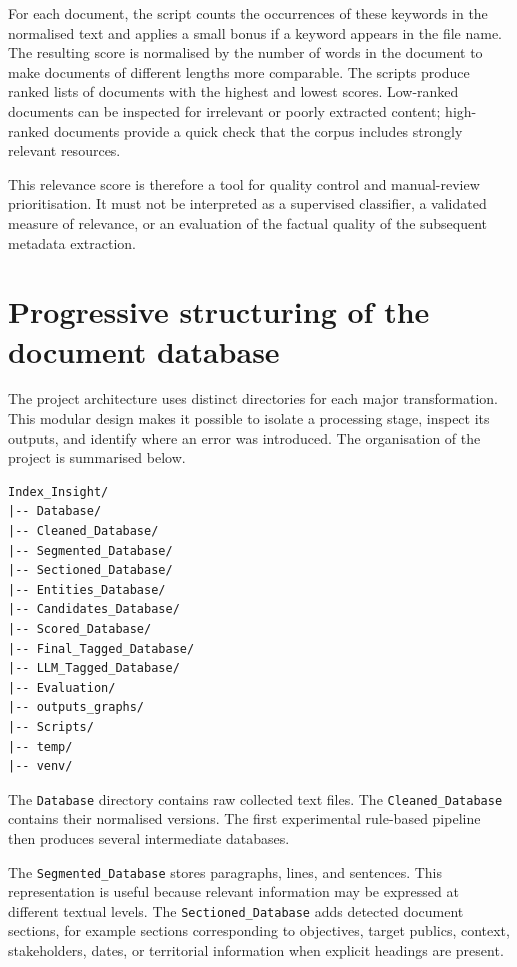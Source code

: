 For each document, the script counts the occurrences of these keywords in the
normalised text and applies a small bonus if a keyword appears in the file name.
The resulting score is normalised by the number of words in the document to make
documents of different lengths more comparable. The scripts produce ranked lists
of documents with the highest and lowest scores. Low-ranked documents can be
inspected for irrelevant or poorly extracted content; high-ranked documents
provide a quick check that the corpus includes strongly relevant resources.

This relevance score is therefore a tool for quality control and manual-review
prioritisation. It must not be interpreted as a supervised classifier, a
validated measure of relevance, or an evaluation of the factual quality of the
subsequent metadata extraction.

\section{Progressive structuring of the document database}

The project architecture uses distinct directories for each major transformation.
This modular design makes it possible to isolate a processing stage, inspect its
outputs, and identify where an error was introduced. The organisation of the
project is summarised below.

\begin{verbatim}
Index_Insight/
|-- Database/
|-- Cleaned_Database/
|-- Segmented_Database/
|-- Sectioned_Database/
|-- Entities_Database/
|-- Candidates_Database/
|-- Scored_Database/
|-- Final_Tagged_Database/
|-- LLM_Tagged_Database/
|-- Evaluation/
|-- outputs_graphs/
|-- Scripts/
|-- temp/
|-- venv/
\end{verbatim}

The \texttt{Database} directory contains raw collected text files. The
\texttt{Cleaned\_Database} contains their normalised versions. The first
experimental rule-based pipeline then produces several intermediate databases.

The \texttt{Segmented\_Database} stores paragraphs, lines, and sentences. This
representation is useful because relevant information may be expressed at
different textual levels. The \texttt{Sectioned\_Database} adds detected
document sections, for example sections corresponding to objectives, target
publics, context, stakeholders, dates, or territorial information when explicit
headings are present.

